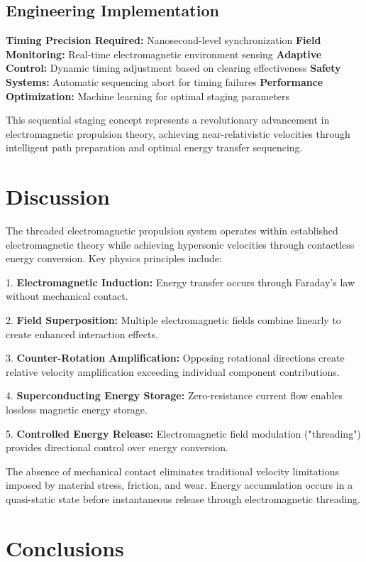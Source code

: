 \documentclass[12pt,a4paper]{article}
\begin{document}
\subsection{Engineering Implementation}

\textbf{Timing Precision Required:} Nanosecond-level synchronization
\textbf{Field Monitoring:} Real-time electromagnetic environment sensing  
\textbf{Adaptive Control:} Dynamic timing adjustment based on clearing effectiveness
\textbf{Safety Systems:} Automatic sequencing abort for timing failures
\textbf{Performance Optimization:} Machine learning for optimal staging parameters

This sequential staging concept represents a revolutionary advancement in electromagnetic propulsion theory, achieving near-relativistic velocities through intelligent path preparation and optimal energy transfer sequencing.


\section{Discussion}

The threaded electromagnetic propulsion system operates within established electromagnetic theory while achieving hypersonic velocities through contactless energy conversion. Key physics principles include:

1. \textbf{Electromagnetic Induction:} Energy transfer occurs through Faraday's law without mechanical contact.

2. \textbf{Field Superposition:} Multiple electromagnetic fields combine linearly to create enhanced interaction effects.

3. \textbf{Counter-Rotation Amplification:} Opposing rotational directions create relative velocity amplification exceeding individual component contributions.

4. \textbf{Superconducting Energy Storage:} Zero-resistance current flow enables lossless magnetic energy storage.

5. \textbf{Controlled Energy Release:} Electromagnetic field modulation ("threading") provides directional control over energy conversion.

The absence of mechanical contact eliminates traditional velocity limitations imposed by material stress, friction, and wear. Energy accumulation occurs in a quasi-static state before instantaneous release through electromagnetic threading.

\section{Conclusions}
\end{document}
